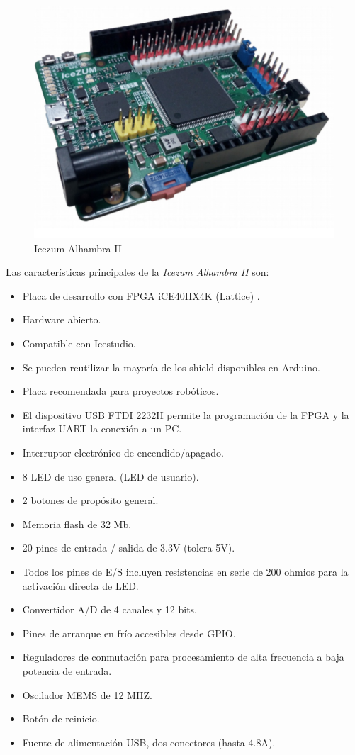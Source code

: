 \begin{figure}[H]
	\center
	\includegraphics[scale=0.6]{imagenes/Herramientas/Icezum.png}
	\caption{Icezum Alhambra II}
	\label{fig:Icezum Alhambra II}
\end{figure}

Las características principales de la \textit{Icezum Alhambra II} son:

\begin{itemize}

	\item Placa de desarrollo con FPGA iCE40HX4K (Lattice) .
	\item Hardware abierto.
	\item Compatible con Icestudio.
	\item Se pueden reutilizar la mayoría de los shield disponibles en Arduino.
	\item Placa recomendada para proyectos robóticos.
	\item El dispositivo USB FTDI 2232H permite la programación de la FPGA y la interfaz UART la conexión a un PC.
	\item Interruptor electrónico de encendido/apagado.
	\item 8 LED de uso general (LED de usuario).
	\item 2 botones de propósito general.
	\item Memoria flash de 32 Mb.
	\item 20 pines de entrada / salida de 3.3V (tolera 5V).
	\item Todos los pines de E/S incluyen resistencias en serie de 200 ohmios para la activación directa de LED.
	\item Convertidor A/D de 4 canales y 12 bits.
	\item Pines de arranque en frío accesibles desde GPIO.
	\item Reguladores de conmutación para procesamiento de alta frecuencia a baja potencia de entrada.
	\item Oscilador MEMS de 12 MHZ.
	\item Botón de reinicio.
	\item Fuente de alimentación USB, dos conectores (hasta 4.8A).
\end{itemize}



